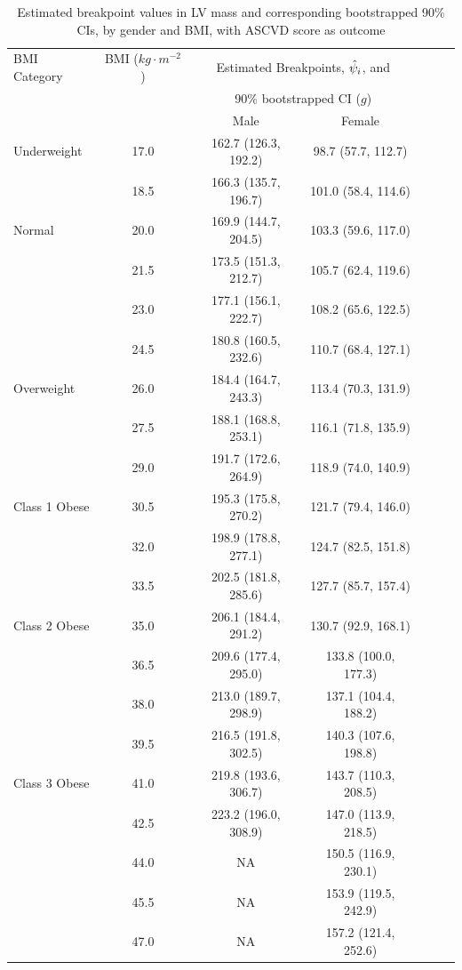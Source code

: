 \documentclass [12pt, proquest] {uwthesis}[2016/11/22]
\begin{document}
\begin{table}
\centering
\renewcommand\arraystretch{0.75}
\begin{tabular}{@{} lcccccc @{}} 
\toprule
    {BMI Category} & {BMI ($kg \cdot m^{-2}$)} & \multicolumn{2}{c}{Estimated Breakpoints, $\Hat{\psi}_i$, and} \\
    & & \multicolumn{2}{c}{90\% bootstrapped CI ($g$)} \\
    \cmidrule(lr){3-4}
     & & Male & Female \\
\midrule
    Underweight & 17.0 & 162.7 (126.3, 192.2) & 98.7 (57.7, 112.7)\\
    & 18.5 & 166.3 (135.7, 196.7) & 101.0 (58.4, 114.6) \\
\midrule
    Normal & 20.0 & 169.9 (144.7, 204.5) & 103.3 (59.6, 117.0) \\
    & 21.5 & 173.5 (151.3, 212.7) & 105.7 (62.4, 119.6) \\
    & 23.0 & 177.1 (156.1, 222.7) & 108.2 (65.6, 122.5) \\
    & 24.5 & 180.8 (160.5, 232.6) & 110.7 (68.4, 127.1) \\
\midrule
    Overweight & 26.0 & 184.4 (164.7, 243.3) & 113.4 (70.3, 131.9) \\
    & 27.5 & 188.1 (168.8, 253.1) & 116.1 (71.8, 135.9) \\
    & 29.0 & 191.7 (172.6, 264.9) & 118.9 (74.0, 140.9) \\
\midrule
    Class 1 Obese & 30.5 & 195.3 (175.8, 270.2) & 121.7 (79.4, 146.0) \\
    & 32.0 & 198.9 (178.8, 277.1) & 124.7 (82.5, 151.8) \\
    & 33.5 & 202.5 (181.8, 285.6) & 127.7 (85.7, 157.4) \\
\midrule
    Class 2 Obese & 35.0 & 206.1 (184.4, 291.2) & 130.7 (92.9, 168.1) \\
    & 36.5 & 209.6 (177.4, 295.0) & 133.8 (100.0, 177.3) \\
    & 38.0 & 213.0 (189.7, 298.9) & 137.1 (104.4, 188.2) \\
    & 39.5 & 216.5 (191.8, 302.5) & 140.3 (107.6, 198.8) \\
\midrule
    Class 3 Obese & 41.0 & 219.8 (193.6, 306.7) & 143.7 (110.3, 208.5) \\
    & 42.5 & 223.2 (196.0, 308.9) & 147.0 (113.9, 218.5) \\
    & 44.0 & NA & 150.5 (116.9, 230.1) \\
    & 45.5 & NA & 153.9 (119.5, 242.9) \\
    & 47.0 & NA & 157.2 (121.4, 252.6) \\
\bottomrule
\end{tabular}
\caption{Estimated breakpoint values in LV mass and corresponding bootstrapped 90\% CIs, by gender and BMI, with ASCVD score as outcome}
\end{table}
\end{document}
